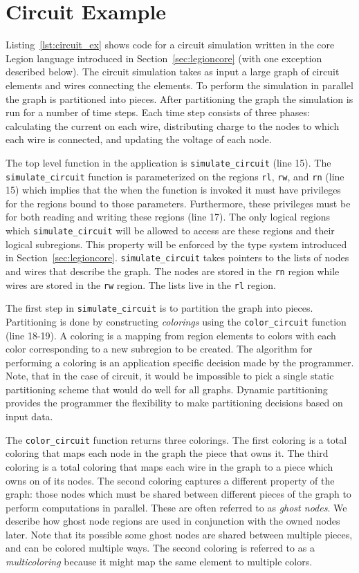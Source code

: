 
\section{Circuit Example}
\label{sec:example}

Listing~\ref{lst:circuit_ex} shows code for a
circuit simulation written in the core Legion language introduced in
Section~\ref{sec:legioncore} (with one exception described below).  The
circuit simulation takes as input a large graph of circuit elements and wires
connecting the elements.  To perform the simulation in parallel the graph
is partitioned into pieces.  After partitioning
the graph the simulation is run for a number of time steps.  Each time step
consists of three phases: calculating the current on each wire, distributing
charge to the nodes to which each wire is connected, and updating the voltage
of each node.

The top level function in the application is {\tt simulate\_circuit} (line 15).  The {\tt simulate\_circuit} 
function is parameterized on the regions {\tt rl}, {\tt rw}, and {\tt rn} (line 15) which 
implies that the when the function is invoked it must have privileges for the regions 
bound to those parameters.  Furthermore, these privileges must be for both reading 
and writing these regions (line 17).  The only logical regions which {\tt simulate\_circuit} will 
be allowed to access are these regions and their logical subregions.  This property will be 
enforced by the type system introduced in Section~\ref{sec:legioncore}.  {\tt simulate\_circuit}
takes pointers to the lists of nodes and wires that describe the graph.  The nodes
are stored in the {\tt rn} region while wires are stored in the {\tt rw} region.  The
lists live in the {\tt rl} region.  

The first step in {\tt simulate\_circuit} is to partition the graph into pieces.  Partitioning
is done by constructing {\em colorings} using the {\tt color\_circuit} function (line 18-19).  A
coloring is a mapping from region elements to colors with each color corresponding to a new subregion
to be created.  The algorithm for performing a coloring is an application specific decision made by 
the programmer.  Note, that in the case of circuit, it would be impossible to
pick a single static partitioning scheme that would do well for all graphs.  Dynamic partitioning
provides the programmer the flexibility to make partitioning decisions based on input data.

The {\tt color\_circuit} function returns three colorings.  The first coloring is a total 
coloring that maps each node in the graph the piece that owns it.  The third coloring is a total
coloring that maps each wire in the graph to a piece which owns on of its nodes.  The second coloring captures a
different property of the graph: those nodes which must be shared between different pieces of the
graph to perform computations in parallel.  These are often referred to as {\em ghost nodes}.  We
describe how ghost node regions are used in conjunction with the owned nodes later.
Note that its possible some ghost nodes are shared between multiple pieces, and can be colored multiple ways. 
The second coloring is referred to as a {\em multicoloring} because it might map the same element
to multiple colors.

